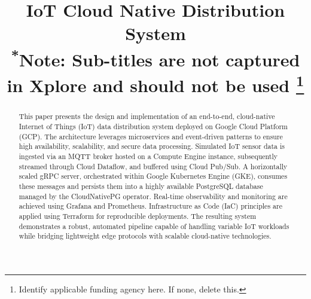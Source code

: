 \documentclass[conference]{IEEEtran}
\begin{document}
\title{IoT Cloud Native Distribution System\\
{\footnotesize \textsuperscript{*}Note: Sub-titles are not captured in Xplore and
should not be used}
\thanks{Identify applicable funding agency here. If none, delete this.}
}

\author{
\and
{}
\and
{}
\and
{}
}
\maketitle

\begin{abstract}
This paper presents the design and implementation of an end-to-end, cloud-native Internet of Things (IoT) data distribution system deployed on Google Cloud Platform (GCP). The architecture leverages microservices and event-driven patterns to ensure high availability, scalability, and secure data processing. Simulated IoT sensor data is ingested via an MQTT broker hosted on a Compute Engine instance, subsequently streamed through Cloud Dataflow, and buffered using Cloud Pub/Sub. A horizontally scaled gRPC server, orchestrated within Google Kubernetes Engine (GKE), consumes these messages and persists them into a highly available PostgreSQL database managed by the CloudNativePG operator. Real-time observability and monitoring are achieved using Grafana and Prometheus. Infrastructure as Code (IaC) principles are applied using Terraform for reproducible deployments. The resulting system demonstrates a robust, automated pipeline capable of handling variable IoT workloads while bridging lightweight edge protocols with scalable cloud-native technologies.

\end{abstract}
\end{document}
